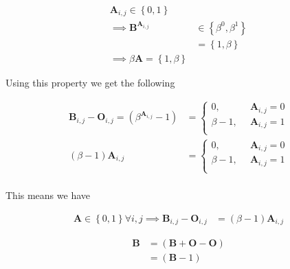 \documentclass[11pt]{article}
\begin{document}
\begin{align*}
\mathbf{A}_{i, j} \in \left\{0, 1\right\} \\
\implies  \mathbf{B}^{\mathbf{A}_{i, j}} &\in \left\{\beta^0, \beta^1\right\} \\
                     &= \left\{1, \beta \right\}  \\
                      \implies  \beta \mathbf{A} = \left\{1, \beta \right\}
\end{align*}


Using this property we get the following


\begin{align*}
\mathbf{B}_{i,j}- \mathbf{O}_{i,j} = \left( \beta^{\mathbf{A}_{i,j}} -1 \right) &=
\begin{cases}
    0      , &\enspace \mathbf{A}_{i,j}=0  \\
    \beta-1, &\enspace \mathbf{A}_{i,j}=1  \\
\end{cases} \\
\left( \beta- 1 \right) \mathbf{A}_{i,j} &=
\begin{cases}
    0      , &\enspace \mathbf{A}_{i,j}=0  \\
    \beta-1, &\enspace \mathbf{A}_{i,j}=1  \\
\end{cases} \\
\end{align*}


This means we have


\begin{align*}
\mathbf{A} \in \left\{0, 1\right\} \forall i,j  \implies   \mathbf{B}_{i,j}- \mathbf{O}_{i,j} &= \left( \beta-1 \right) \mathbf{A}_{i,j}
\end{align*}



\begin{align*}
\mathbf{B}&= \left( \mathbf{B}+  \mathbf{O}- \mathbf{O} \right) \\
&= \left( \mathbf{B}- 1 \right)
\end{align*}
\end{document}
